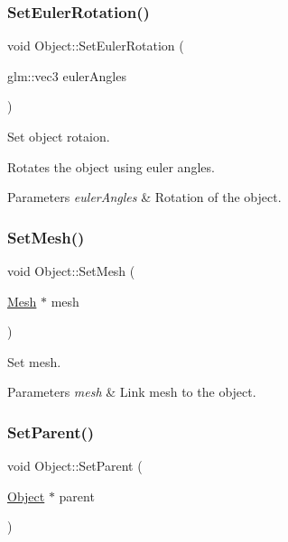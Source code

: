 \subsubsection{\texorpdfstring{Set\+Euler\+Rotation()}{SetEulerRotation()}}
{\footnotesize\ttfamily void Object\+::\+Set\+Euler\+Rotation (\begin{DoxyParamCaption}\item[{glm\+::vec3}]{euler\+Angles }\end{DoxyParamCaption})}



Set object rotaion. 

Rotates the object using euler angles. 
\begin{DoxyParams}{Parameters}
{\em euler\+Angles} & Rotation of the object. \\
\hline
\end{DoxyParams}
\mbox{\label{class_object_a6be7369b2a3382f82ea8d3e61c061b59}} 
\subsubsection{\texorpdfstring{Set\+Mesh()}{SetMesh()}}
{\footnotesize\ttfamily void Object\+::\+Set\+Mesh (\begin{DoxyParamCaption}\item[{\hyperlink{class_mesh}{Mesh} $\ast$}]{mesh }\end{DoxyParamCaption})}



Set mesh. 


\begin{DoxyParams}{Parameters}
{\em mesh} & Link mesh to the object. \\
\hline
\end{DoxyParams}
\mbox{\label{class_object_a344ba3716db86c373345265935280968}} 
\subsubsection{\texorpdfstring{Set\+Parent()}{SetParent()}}
{\footnotesize\ttfamily void Object\+::\+Set\+Parent (\begin{DoxyParamCaption}\item[{\hyperlink{class_object}{Object} $\ast$}]{parent }\end{DoxyParamCaption})}



